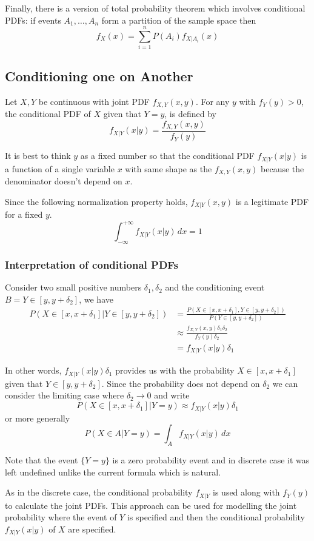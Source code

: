 Finally, there is a version of total probability theorem which involves conditional PDFs: if events $A_1, \ldots, A_n$ form a partition of the sample space then
\[\boxed {f_X(x) = \sum_{i=1}^{n} P(A_i)f_{X|A_i}(x)}\]

\subsection{Conditioning one \RV on Another}
Let $X, Y$ be continuous \rv with joint PDF $f_{X,Y}(x,y)$. For any $y$ with $f_Y(y)>0$, the conditional PDF of $X$ given that $Y=y$, is defined by 
\[\boxed{f_{X|Y}(x|y) = \frac{f_{X,Y}(x,y)}{f_Y(y)}}\]

It is best to think $y$ as a fixed number so that the conditional PDF $f_{X|Y}(x|y)$ is a function of a single variable $x$ with same shape as the $f_{X,Y}(x,y)$ because the denominator doesn't depend on $x$.

Since the following normalization property holds, $f_{X|Y}(x,y)$ is a legitimate PDF for a fixed $y$.
\[\int_{-\infty}^{+\infty}f_{X|Y}(x|y)\,dx=1\]

\subsubsection{Interpretation of conditional PDFs}
Consider two small positive numbers $\delta_1, \delta_2$ and the conditioning event $B={Y\in [y, y+\delta_2]}$, we have
\begin{align*}
    P(X \in [x, x+\delta_1]|Y \in [y, y+\delta_2]) & =\frac{P(X \in [x, x+\delta_1],Y \in [y, y+\delta_2])}{P(Y \in [y, y+\delta_2])} \\
    & \approx \frac{f_{X,Y}(x,y)\delta_1\delta_2}{f_Y(y)\delta_2} \\
    &= f_{X|Y}(x|y)\delta_1
\end{align*}

In other words, $f_{X|Y}(x|y)\delta_1$ provides us with the probability $X \in [x,x+\delta_1]$ given that $Y\in [y, y+\delta_2]$. Since the probability does not depend on $\delta_2$ we can consider the limiting case where $\delta_2 \to 0$ and write
\[P(X\in[x,x+\delta_1]|Y=y) \approx f_{X|Y}(x|y)\delta_1\]
or more generally
\[P(X \in A|Y=y) = \int_{A}f_{X|Y}(x|y) \, dx\]

Note that the event $\{Y=y\}$ is a zero probability event and in discrete case it was left undefined unlike the current formula which is natural.

As in the discrete case, the conditional probability $f_{X|Y}$ is used along with $f_Y(y)$ to calculate the joint PDFs. This approach can be used for modelling the joint probability where the event of $Y$ is specified and then the conditional probability $f_{X|Y}(x|y)$ of $X$ are specified.

